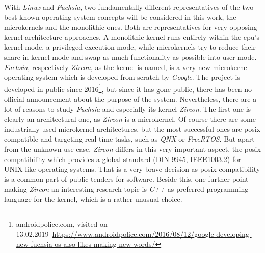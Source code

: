 With \textit{Linux} and \textit{Fuchsia}, two fundamentally different representatives of the two best-known operating system concepts will be considered in this work, the microkernels and the monolithic ones. %
Both are representatives for very opposing kernel architecture approaches.
A monolithic kernel runs entirely within the \ac{cpu}'s kernel mode, a privileged execution mode, while microkernels try to reduce their share in kernel mode and swap as much functionality as possible into user mode.
\textit{Fuchsia}, respectively \textit{Zircon}, as the kernel is named, is a very new microkernel operating system which is developed from scratch by \textit{Google}.
The project is developed in public since 2016\footnote{androidpolice.com, visited on 13.02.2019~\url{https://www.androidpolice.com/2016/08/12/google-developing-new-fuchsia-os-also-likes-making-new-words/}}, but since it has gone public, there has been no official announcement about the purpose of the system.
Nevertheless, there are a lot of reasons to study \textit{Fuchsia} and especially its kernel \textit{Zircon}.
The first one is clearly an architectural one, as \textit{Zircon} is a microkernel.
Of course there are some industrially used microkernel architectures, but the most successful ones are \ac{posix} compatible and targeting real time tasks, such as \textit{QNX} or \textit{FreeRTOS}. %
But apart from the unknown use-case, \textit{Zircon} differs in this very important aspect, the \ac{posix} compatibility which provides a global standard (DIN 9945, IEEE1003.2) for UNIX-like operating systems\cite{wolf2009c}.
That is a very brave decision as \ac{posix} compatibility is a common part of public tenders for software.
Beside this, one further point making \textit{Zircon} an interesting research topic is \textit{C++} as preferred programming language for the kernel, which is a rather unusual choice\cite{tanenbaum-modern-operating-systems}.

